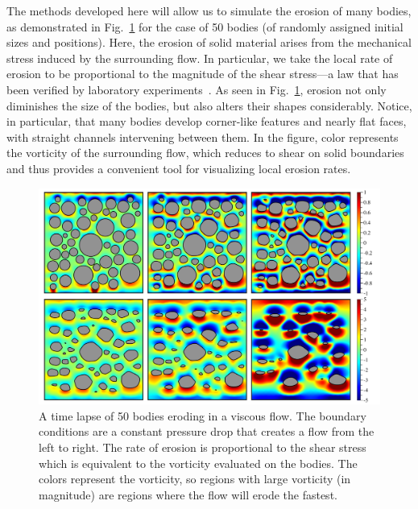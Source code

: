 \documentclass[preprint, 10pt]{elsarticle}
\begin{document}
The methods developed here will allow us to simulate the erosion of many bodies, as demonstrated in Fig.~\ref{fig:50bodies} for the case of 50 bodies (of randomly assigned initial sizes and positions). Here, the erosion of solid material arises from the mechanical stress induced by the surrounding flow. In particular, we take the local rate of erosion to be proportional to the magnitude of the shear stress---a law that has been verified by laboratory experiments~\cite{ris-moo-chi-she-zha2012}. As seen in Fig.~\ref{fig:50bodies}, erosion not only diminishes the size of the bodies, but also alters their shapes considerably. Notice, in particular, that many bodies develop corner-like features and nearly flat faces, with straight channels intervening between them. In the figure, color represents the vorticity of the surrounding flow, which reduces to shear on solid boundaries and thus provides a convenient tool for visualizing local erosion rates.


\begin{figure}%
\begin{center}
\includegraphics[width = 0.80 \textwidth]{./figs/50bod.pdf}
\caption{\label{fig:50bodies} A time lapse of 50 bodies eroding in a viscous flow.  The boundary conditions are a constant pressure drop that creates a flow from the left to right.  The rate of erosion is proportional to the shear stress which is equivalent to the vorticity evaluated on the bodies.  The colors represent the vorticity, so regions with large vorticity (in magnitude) are regions where the flow will erode the fastest.}
\end{center}
\end{figure}
\end{document}
